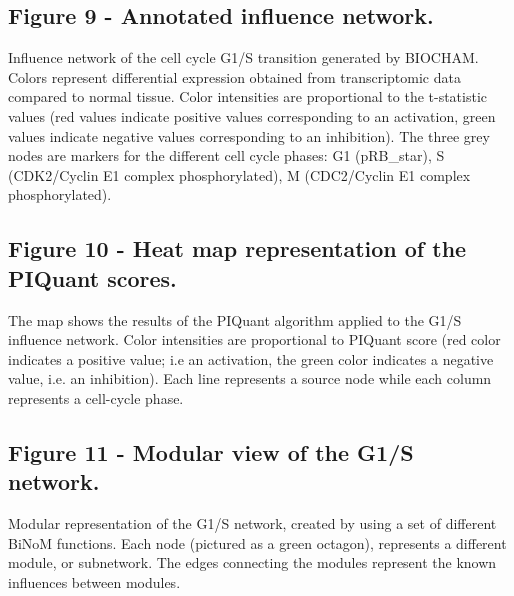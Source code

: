 \documentclass[10pt]{bmc_article}
\newenvironment{bmcformat}{\baselineskip20pt\sloppy\setboolean{publ}{false}}{\baselineskip20pt\sloppy}
\begin{document}
\begin{bmcformat}
  \subsection*{Figure 9 - Annotated influence network.}
Influence network of the cell cycle G1/S transition generated by BIOCHAM. Colors represent differential
expression obtained from transcriptomic data compared to normal tissue. Color
intensities are proportional to the t-statistic values (red values indicate
positive values corresponding to an activation, green values indicate negative
values corresponding to an inhibition). The three grey nodes are markers for the
different cell cycle phases: G1 (pRB\_star), S (CDK2/Cyclin E1 complex phosphorylated), M (CDC2/Cyclin E1 complex phosphorylated).

  \subsection*{Figure 10 - Heat map representation of the PIQuant scores.}
The map shows the results of the PIQuant algorithm applied to the G1/S
influence network. Color intensities are proportional to PIQuant score (red color indicates a positive
value; i.e an activation, the green color indicates a negative value, i.e. an
inhibition).
Each line represents a source node while each column represents a cell-cycle
phase.

  \subsection*{Figure 11 - Modular view of the G1/S network.}
Modular representation of the G1/S network, created by using a set of
different BiNoM functions. Each node (pictured as a green octagon), represents a
different module, or subnetwork. The edges connecting the modules represent the
 known influences between modules.




\end{bmcformat}
\end{document}
